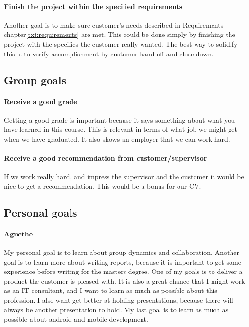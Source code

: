 \paragraph{Finish the project within the specified requirements}
Another goal is to make sure customer's needs described in Requirements chapter\ref{txt:requirements} are met.
This could be done simply by finishing the project with the specifics the customer really wanted. 
The best way to solidify this is to verify accomplishment by customer hand off and close down.

\subsection{Group goals}
\paragraph{Receive a good grade}
Getting a good grade is important because it says something about what you have learned in this course. 
This is relevant in terms of what job we might get when we have graduated. It also shows an employer that we can work hard. 
\paragraph{Receive a good recommendation from customer/supervisor}
If we work really hard, and impress the supervisor and the customer it would be nice to get a recommendation. This would be a bonus for our CV.

\subsection{Personal goals}
\paragraph{Agnethe}

My personal goal is to learn about group dynamics and collaboration. Another goal is to learn more about writing reports, because it is important to get some experience before writing for the masters degree. One of my goals is to deliver a product the customer is pleased with. It is also a great chance that I might work as an IT-consultant, and I want to learn as much as possible about this profession. I also want get better at holding presentations, because there will always be another presentation to hold. My last goal is to learn as much as possible about android and mobile development.

